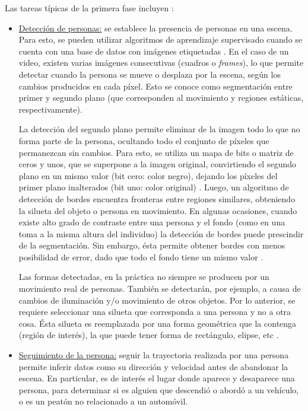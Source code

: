 \documentclass[../memoria.tex]{subfiles}
\begin{document}
\indent Las tareas típicas de la primera fase incluyen \cite{yilmaz2006object}:
	\begin{itemize}
	\item \underline{Detección de personas:} se establece la presencia de personas en una escena. Para esto, se pueden utilizar algoritmos de aprendizaje supervisado cuando se cuenta con una base de datos con imágenes etiquetadas \cite{dalal2005histograms}. En el caso de un video, existen varias imágenes consecutivas (cuadros o \emph{frames}), lo que permite detectar cuando la persona se mueve o desplaza por la escena, según los cambios producidos en cada píxel. Esto se conoce como segmentación entre primer y segundo plano (que corresponden al movimiento y regiones estáticas, respectivamente).

	\indent La detección del segundo plano permite eliminar de la imagen todo lo que no forma parte de la persona, ocultando todo el conjunto de píxeles que permanezcan sin cambios. Para esto, se utiliza un mapa de bits o matriz de ceros y unos, que se superpone a la imagen original, convirtiendo el segundo plano en un mismo valor (bit cero: color negro), dejando los píxeles del primer plano inalterados (bit uno: color original) \cite{bouwmans2008background}. Luego, un algoritmo de detección de bordes \cite{canny1986computational} encuentra fronteras entre regiones similares, obteniendo la silueta del objeto o persona en movimiento. En algunas ocasiones, cuando existe alto grado de contraste entre una persona y el fondo (como en una toma a la misma altura del individuo) la detección de bordes puede prescindir de la segmentación. Sin embargo, ésta permite obtener bordes con menos posibilidad de error, dado que todo el fondo tiene un mismo valor \cite{bouwmans2008background}.

	\indent Las formas detectadas, en la práctica no siempre se producen por un movimiento real de personas. También se detectarán, por ejemplo, a causa de cambios de iluminación y/o movimiento de otros objetos. Por lo anterior, se requiere seleccionar una silueta que corresponda a una persona y no a otra cosa. Ésta silueta es reemplazada por una forma geométrica que la contenga (región de interés), la que puede tener forma de rectángulo, elipse, etc \cite{yilmaz2006object}.%

	\item \underline{Seguimiento de la persona:} seguir la trayectoria realizada por una persona permite inferir datos como su dirección y velocidad antes de abandonar la escena. En particular, es de interés el lugar donde aparece y desaparece una persona, para determinar si es alguien que descendió o abordó a un vehículo, o es un peatón no relacionado a un automóvil. %


\end{itemize}
\end{document}
